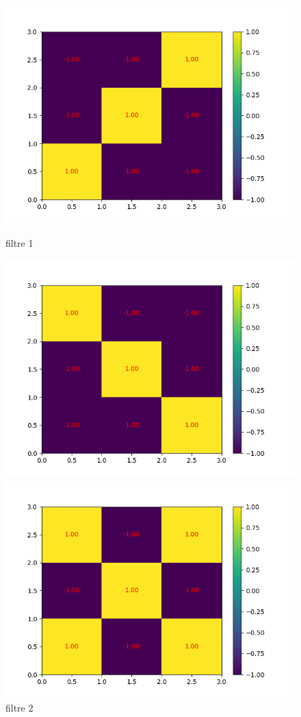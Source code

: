 \begin{figure}[!htb]
        \includegraphics[width=\textwidth]{img/cnn_exemple/cross/filtre_1.png}
        \caption{filtre 1}
    \endminipage\hfill
        \includegraphics[width=\textwidth]{img/cnn_exemple/cross/filtre_2.png}
        \caption{filtre 2}
    \endminipage\hfill
        \includegraphics[width=\textwidth]{img/cnn_exemple/cross/filtre_3.png}

\end{figure}
